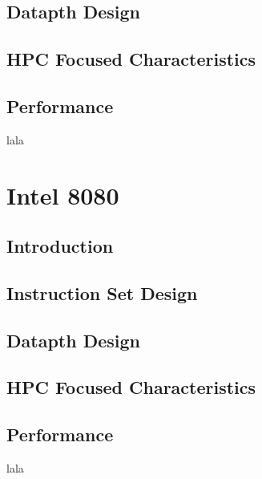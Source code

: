 \documentclass[draftclsnofoot, onecolumn, 10pt, compsoc]{IEEEtran}
\begin{document}
        \subsection{Datapth Design}
            
        \subsection{HPC Focused Characteristics}
           
        \subsection{Performance}
            lala
        \newpage
        
    \section{Intel 8080}
            
        \subsection{Introduction}
            
        \subsection{Instruction Set Design}
            
        \subsection{Datapth Design}
            
        \subsection{HPC Focused Characteristics}
           
        \subsection{Performance}
            lala
        

    \newpage           
    
    
    
\end{document}
